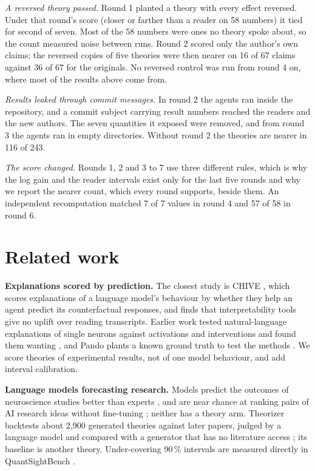 \documentclass[10pt]{article}
\begin{document}
\emph{A reversed theory passed.} Round 1 planted a theory with every effect reversed. Under that round's score
(closer or farther than a reader on 58 numbers) it tied for second of seven. Most of the 58 numbers were ones no
theory spoke about, so the count measured noise between runs. Round 2 scored only the author's own claims; the
reversed copies of five theories were then nearer on 16 of 67 claims against 36 of 67 for the originals. No
reversed control was run from round 4 on, where most of the results above come from.

\emph{Results leaked through commit messages.} In round 2 the agents ran inside the repository, and a commit
subject carrying result numbers reached the readers and the new authors. The seven quantities it exposed were
removed, and from round 3 the agents ran in empty directories. Without round 2 the theories are nearer in 116 of
243.

\emph{The score changed.} Rounds 1, 2 and 3 to 7 use three different rules, which is why the log gain and the
reader intervals exist only for the last five rounds and why we report the nearer count, which every round
supports, beside them. An independent recomputation matched 7 of 7 values in round 4 and 57 of 58 in round 6.

\section{Related work}

\textbf{Explanations scored by prediction.} The closest study is CHIVE \cite{karvonen2026chive}, which scores
explanations of a language model's behaviour by whether they help an agent predict its counterfactual responses,
and finds that interpretability tools give no uplift over reading transcripts. Earlier work tested
natural-language explanations of single neurons against activations and interventions and found them wanting
\cite{huang2023rigorously}, and Pando plants a known ground truth to test the methods \cite{zhong2026pando}. We
score theories of experimental results, not of one model behaviour, and add interval calibration.

\textbf{Language models forecasting research.} Models predict the outcomes of neuroscience studies better than
experts \cite{luo2024neuro}, and are near chance at ranking pairs of AI research ideas without fine-tuning
\cite{wen2025predicting}; neither has a theory arm. Theorizer backtests about 2{,}900 generated theories against
later papers, judged by a language model and compared with a generator that has no literature access
\cite{jansen2026theorizer}; its baseline is another theory. Under-covering 90\,\% intervals are measured
directly in QuantSightBench \cite{qin2026quantsight}.
\end{document}
